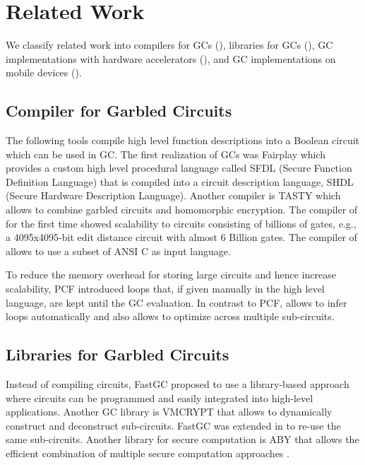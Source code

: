 \chapter{Related Work}\label{chap:related}
We classify related work into compilers for GCs (), libraries for GCs (), GC implementations with hardware accelerators (), and GC implementations on mobile devices ().

\section{Compiler for Garbled Circuits}\label{sec:GCCompiler}
The following tools compile high level function descriptions into a Boolean circuit which can be used in GC.
The first realization of GCs was Fairplay \cite{malkhi2004fairplay} which provides a custom high level procedural language called SFDL (Secure Function Definition Language) that is compiled into a circuit description language, SHDL (Secure Hardware Description Language).
Another compiler is TASTY \cite{HKSSW10} which allows to combine garbled circuits and homomorphic encryption.
The compiler of \cite{kreuter2012billion} for the first time showed scalability to circuits consisting of billions of gates, e.g., a 4095x4095-bit edit distance circuit with almost 6 Billion gates.
The compiler of \cite{franz2014cbmc} allows to use a subset of ANSI C as input language.

To reduce the memory overhead for storing large circuits and hence increase scalability, PCF \cite{kreuter2013pcf} introduced loops that, if given manually in the high level language, are kept until the GC evaluation.
In contrast to PCF, \sys{} allows to infer loops automatically and also allows to optimize across multiple sub-circuits.

\section{Libraries for Garbled Circuits}\label{sec:GCLibs}
Instead of compiling circuits, FastGC \cite{huang2011faster} proposed to use a library-based approach where circuits can be programmed and easily integrated into high-level applications.
Another GC library is VMCRYPT \cite{malka2011vmcrypt} that allows to dynamically construct and deconstruct sub-circuits.
FastGC was extended in \cite{HS13} to re-use the same sub-circuits.
Another library for secure computation is ABY that allows the efficient combination of multiple secure computation approaches \cite{DSZ15}.


